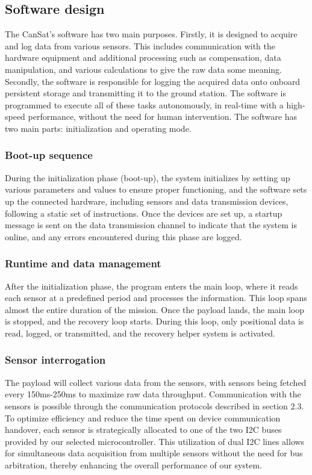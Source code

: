 
\subsection{Software design}

The CanSat’s software has two main purposes. Firstly, it is designed to acquire and log data from various sensors. This includes communication with the hardware equipment and additional processing such as compensation, data manipulation, and various calculations to give the raw data some meaning. Secondly, the software is responsible for logging the acquired data onto onboard persistent storage and transmitting it to the ground station. The software is programmed to execute all of these tasks autonomously, in real-time with a high-speed performance, without the need for human intervention. The software has two main parts: initialization and operating mode. 

\subsubsection{Boot-up sequence}
During the initialization phase (boot-up), the system initializes by setting up various parameters and values to ensure proper functioning, and the software sets up the connected hardware, including sensors and data transmission devices, following a static set of instructions. Once the devices are set up, a startup message is sent on the data transmission channel to indicate that the system is online, and any errors encountered during this phase are logged.

\subsubsection{Runtime and data management}
After the initialization phase, the program enters the main loop, where it reads each sensor at a predefined period and processes the information. This loop spans almost the entire duration of the mission. Once the payload lands, the main loop is stopped, and the recovery loop starts. During this loop, only positional data is read, logged, or transmitted, and the recovery helper system is activated.

\subsubsection{Sensor interrogation}
The payload will collect various data from the sensors, with sensors being fetched every 150ms-250ms to maximize raw data throughput. Communication with the sensors is possible through the communication protocols described in section 2.3. To optimize efficiency and reduce the time spent on device communication handover, each sensor is strategically allocated to one of the two I2C buses provided by our selected microcontroller. This utilization of dual I2C lines allows for simultaneous data acquisition from multiple sensors without the need for bus arbitration, thereby enhancing the overall performance of our system.

